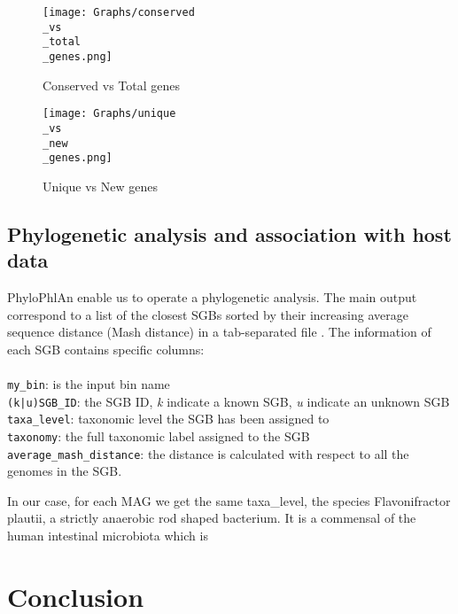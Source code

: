 \documentclass[a4paper,titlepage]{book}
\newcommand{\code}[1]{\colorbox{light-gray}{\texttt{#1}}}
\begin{document}
\begin{figure}[ht]
\centering
\texttt{[image: Graphs/conserved\\\_vs\\\_total\\\_genes.png]}
\caption{Conserved vs Total genes}
\label{fig:pangenome3}
\end{figure}

\begin{figure}[ht]
\centering
\texttt{[image: Graphs/unique\\\_vs\\\_new\\\_genes.png]}
\caption{Unique vs New genes}
\label{fig:pangenome4}
\end{figure}

\section{Phylogenetic analysis and association with host data}
PhyloPhlAn enable us to operate a phylogenetic analysis. The main output correspond to a list of the closest SGBs sorted by their increasing average sequence distance (Mash distance) in a tab-separated file \cite{PhyloGuide}. The information of each SGB contains specific columns:
\\
\\ \code{my\_bin}: is the input bin name
\\ \code{(k|u)SGB\_ID}: the SGB ID, \textit{k} indicate a known SGB, \textit{u} indicate an unknown SGB
\\ \code{taxa\_level}: taxonomic level the SGB has been assigned to
\\ \code{taxonomy}: the full taxonomic label assigned to the SGB
\\ \code{average\_mash\_distance}: the distance is calculated with respect to all the genomes in the SGB.

In our case, for each MAG we get the same taxa\_level, the species Flavonifractor plautii, a strictly anaerobic rod shaped bacterium. It is a commensal of the human intestinal microbiota which is  \cite{Plauti}
\chapter{Conclusion}
\end{document}
